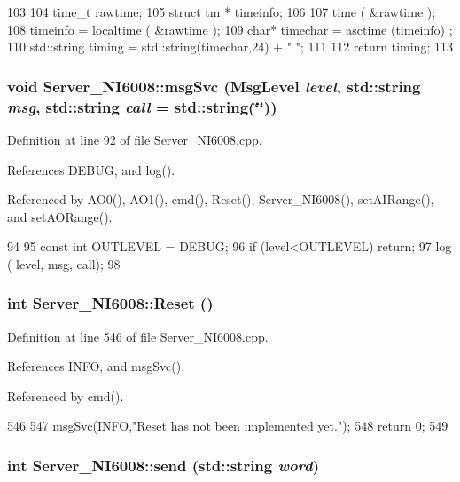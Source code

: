 \begin{DoxyCode}
103                                 {
104   time_t rawtime;
105   struct tm * timeinfo;
106   
107   time ( &rawtime );
108   timeinfo = localtime ( &rawtime );
109   char* timechar =  asctime (timeinfo) ;
110   std::string timing = std::string(timechar,24) + " ";
111 
112   return timing;
113 }
\end{DoxyCode}
\hypertarget{classServer__NI6008_a140d5f91d6c0f4fb963ecf747e44df78}{
\subsubsection[{msgSvc}]{\setlength{\rightskip}{0pt plus 5cm}void Server\_\-NI6008::msgSvc ({\bf MsgLevel} {\em level}, \/  std::string {\em msg}, \/  std::string {\em call} = {\ttfamily std::string(\char`\"{}\char`\"{})})}}
\label{classServer__NI6008_a140d5f91d6c0f4fb963ecf747e44df78}


Definition at line 92 of file Server\_\-NI6008.cpp.

References DEBUG, and log().

Referenced by AO0(), AO1(), cmd(), Reset(), Server\_\-NI6008(), setAIRange(), and setAORange().


\begin{DoxyCode}
94                                      {
95   const int OUTLEVEL = DEBUG;
96   if (level<OUTLEVEL) return;
97   log ( level, msg, call);  
98 } 
\end{DoxyCode}
\hypertarget{classServer__NI6008_a0495ec12779e4b9bfdda3d60c0ef20aa}{
\subsubsection[{Reset}]{\setlength{\rightskip}{0pt plus 5cm}int Server\_\-NI6008::Reset ()}}
\label{classServer__NI6008_a0495ec12779e4b9bfdda3d60c0ef20aa}


Definition at line 546 of file Server\_\-NI6008.cpp.

References INFO, and msgSvc().

Referenced by cmd().


\begin{DoxyCode}
546                         {
547   msgSvc(INFO,"Reset has not been implemented yet.");
548   return 0;
549 }
\end{DoxyCode}
\hypertarget{classServer__NI6008_af47694911afff2feb37a091d9fcab4fa}{
\subsubsection[{send}]{\setlength{\rightskip}{0pt plus 5cm}int Server\_\-NI6008::send (std::string {\em word})}}
\label{classServer__NI6008_af47694911afff2feb37a091d9fcab4fa}


